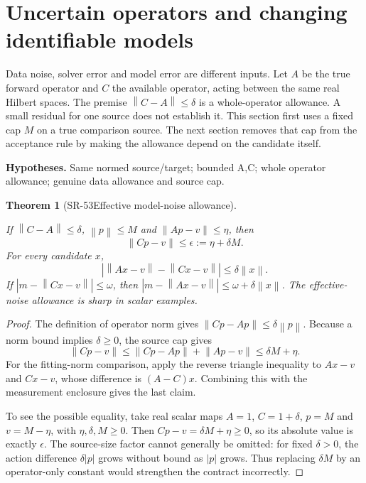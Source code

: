 \documentclass[11pt]{article}
\newtheorem{theorem}{Theorem}[section]
\theoremstyle{definition}\newtheorem{definition}[theorem]{Definition}
\theoremstyle{remark}\newtheorem{remark}[theorem]{Remark}
\newcommand{\nn}[1]{\left\lVert #1\right\rVert}
\begin{document}
\section{Uncertain operators and changing identifiable models}

Data noise, solver error and model error are different inputs. Let $A$ be
the true forward operator and $C$ the available operator, acting between the
same real Hilbert spaces. The premise $\nn{C-A}\le\delta$ is a whole-operator
allowance. A small residual for one source does not establish it.
This section first uses a fixed cap $M$ on a true comparison source.
The next section removes that cap from the acceptance rule by making the
allowance depend on the candidate itself.


\par{\small\textbf{Hypotheses.} Same normed source/\allowbreak target; bounded A,C; whole operator allowance; genuine data allowance and source cap.}\par

\begin{theorem}[SR-53\quad Effective model-noise allowance]\label{SR-53}

If $\nn{C-A}\le\delta$, $\nn p\le M$ and $\nn{Ap-v}\le\eta$, then
\[
\nn{Cp-v}\le\epsilon:=\eta+\delta M.
\]
For every candidate $x$,
\[
|\nn{Ax-v}-\nn{Cx-v}|\le\delta\nn x.
\]
If $|m-\nn{Cx-v}|\le\omega$, then
$|m-\nn{Ax-v}|\le\omega+\delta\nn x$.
The effective-noise allowance is sharp in scalar examples.

\end{theorem}
\begin{proof}

The definition of operator norm gives
$\nn{Cp-Ap}\le\delta\nn p$. Because a norm bound implies
$\delta\ge0$, the source cap gives
\[
\nn{Cp-v}\le\nn{Cp-Ap}+\nn{Ap-v}
\le\delta M+\eta .
\]
For the fitting-norm comparison, apply the reverse triangle inequality
to $Ax-v$ and $Cx-v$, whose difference is $(A-C)x$. Combining this
with the measurement enclosure gives the last claim.

To see the possible equality, take real scalar maps
$A=1$, $C=1+\delta$, $p=M$ and $v=M-\eta$, with
$\eta,\delta,M\ge0$. Then
$Cp-v=\delta M+\eta\ge0$, so its absolute value is exactly $\epsilon$.
The source-size factor cannot generally be omitted: for fixed
$\delta>0$, the action difference $\delta|p|$ grows without bound as
$|p|$ grows. Thus replacing $\delta M$ by an operator-only constant
would strengthen the contract incorrectly.

\end{proof}
\end{document}
